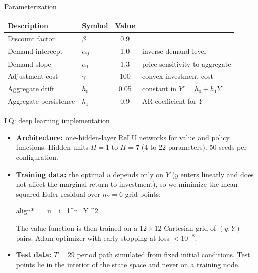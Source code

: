 \documentclass[aspectratio=169,10pt]{beamer}
\newcommand{\emphcolor}[1]{\textbf{\textcolor{emphcolorval}{#1}}}
\begin{document}
\begin{frame}{Parameterization}
	\vspace{0.2in}
	\begin{center}
		\begin{tabular}{llcl}
			\toprule
			Description & Symbol & Value & \\
			\midrule
			Discount factor       & $\beta$    & \textcolor{emphcolorval}{0.9}  & \\
			Demand intercept      & $\alpha_0$ & \textcolor{emphcolorval}{1.0}  & inverse demand level \\
			Demand slope          & $\alpha_1$ & \textcolor{emphcolorval}{1.3}  & price sensitivity to aggregate \\
			Adjustment cost       & $\gamma$   & \textcolor{emphcolorval}{100}  & convex investment cost \\
			Aggregate drift       & $h_0$      & \textcolor{emphcolorval}{0.05} & constant in $Y' = h_0 + h_1 Y$ \\
			Aggregate persistence & $h_1$      & \textcolor{emphcolorval}{0.9}  & AR coefficient for $Y$ \\
			\bottomrule
		\end{tabular}
	\end{center}
\end{frame}

\begin{frame}{LQ: deep learning implementation}
	\begin{itemize}
		\item \emphcolor{Architecture:} one-hidden-layer ReLU networks for value and policy functions. Hidden units $H = 1$ to $H = 7$ (4 to 22 parameters). 50 seeds per configuration.
		\item \emphcolor{Training data:} the optimal $u$ depends only on $Y$ ($y$ enters linearly and does not affect the marginal return to investment), so we minimize the mean squared Euler residual over $n_Y = 6$ grid points:
		\begin{empheq}[box=\tcbhighmath]{align*}
			\min_{\theta_u}  \sum_{i=1}^{n_Y} ^2
		\end{empheq}
		The value function is then trained on a $12 \times 12$ Cartesian grid of $(y,Y)$ pairs. Adam optimizer with early stopping at loss $< 10^{-8}$.
		\item \emphcolor{Test data:} $T = 29$ period path simulated from fixed initial conditions. Test points lie in the interior of the state space and never on a training node.
	\end{itemize}
\end{frame}
\end{document}
